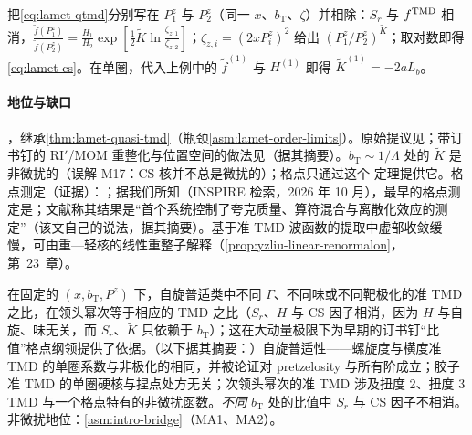 \begin{proofsketch}
把\cref{eq:lamet-qtmd}分别写在 $P_1^z$ 与 $P_2^z$（同一 $x$、$b_{\mathrm T}$、$\zeta$）并相除：$S_r$ 与 $f^{\rm TMD}$ 相消，$\frac{\tilde f(P_1^z)}{\tilde f(P_2^z)}=\frac{H_1}{H_2}\exp[\frac12\tilde K\ln\frac{\zeta_{z,1}}{\zeta_{z,2}}]$；$\zeta_{z,i}=(2xP^z_i)^2$ 给出 $(P_1^z/P_2^z)^{\tilde K}$；取对数即得\cref{eq:lamet-cs}。在单圈，代入上例中的 $\tilde f^{(1)}$ 与 $H^{(1)}$ 即得 $\tilde K^{(1)}=-2aL_b$。
\end{proofsketch}

\paragraph{地位与缺口}
\tagA，继承\cref{thm:lamet-quasi-tmd}（瓶颈\cref{asm:lamet-order-limits}）。原始提议见\cite{EbertStewartZhao2019}；带订书钉的 RI$'$/MOM 重整化与位置空间的做法见\cite{Ebert:2019tvc}（据其摘要）。$b_{\mathrm T}\sim1/\Lambda$ 处的 $\tilde K$ 是非微扰的（误解 M17：CS 核并不总是微扰的）；格点只通过这个 \tagA 定理提供它。格点测定（证据）：\cite{Shanahan:2020zxr,Shanahan:2021tst,Schlemmer:2021aij,LatticePartonLPC:2022eev,LatticePartonLPC:2023pdv,Avkhadiev:2023poz,Avkhadiev:2024mgd,Bollweg:2024zet,Tan:2025ofx}；据我们所知（INSPIRE 检索，2026 年 10 月），最早的格点测定是\cite{Shanahan:2020zxr}；文献\cite{Avkhadiev:2024mgd}称其结果是“首个系统控制了夸克质量、算符混合与离散化效应的测定”（该文自己的说法，据其摘要）。基于准 TMD 波函数的提取中虚部收敛缓慢，可由重—轻核的线性重整子解释（\cref{prop:yzliu-linear-renormalon}，第~23~章）。

\begin{proposition}\label{prop:lamet-tmd-ratios}
在固定的 $(x,b_{\mathrm T},P^z)$ 下，自旋普适类中不同 $\Gamma$、不同味或不同靶极化的准 TMD 之比，在领头幂次等于相应的 TMD 之比（$S_r$、$H$ 与 CS 因子相消，因为 $H$ 与自旋、味无关，而 $S_r$、$\tilde K$ 只依赖于 $b_{\mathrm T}$）；这在大动量极限下为早期的订书钉“比值”格点纲领\cite{Hagler:2009mb,Musch:2010ka,Musch:2011er,Yoon:2017qzo}提供了依据\cite{Ebert:2022fmh,Vladimirov:2020ofp}。（以下据其摘要：）自旋普适性——螺旋度与横度准 TMD 的单圈系数与非极化的相同，并被论证对 pretzelosity 与所有阶成立\cite{Ebert:2020gxr}；胶子准 TMD 的单圈硬核与捏点处方无关\cite{Zhu:2022bja}；次领头幂次的准 TMD 涉及扭度 2、扭度 3 TMD 与一个格点特有的非微扰函数\cite{Rodini:2022wic}。\emph{不同} $b_{\mathrm T}$ 处的比值中 $S_r$ 与 CS 因子不相消。
非微扰地位：\cref{asm:intro-bridge}（MA1、MA2）。
\end{proposition}


